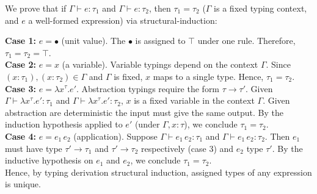 \begin{Proof}

    We prove that if $\Gamma \vdash e : \tau_1$ and $\Gamma \vdash e : \tau_2$, then $\tau_1 = \tau_2$ ($\Gamma$ is a fixed typing context, and $e$ a well-formed expression)
    via structural-induction:

    \noindent
    \textbf{Case 1:} $e = \bullet$ (unit value).  
    The $\bullet$ is assigned to $\top$ under one rule. Therefore, $\tau_1 = \tau_2 = \top$.
    \\

    \noindent
    \textbf{Case 2:} $e = x$ (a variable).  
    Variable typings depend on the context $\Gamma$. Since $(x : \tau_1), (x : \tau_2) \in \Gamma$ and $\Gamma$ is fixed, $x$ maps to a single type. Hence, $\tau_1 = \tau_2$.
    \\

    \noindent
    \textbf{Case 3:} $e = \lambda x^\tau. e'$.  
    Abstraction typings require the form $\tau \to \tau'$.  
    Given $\Gamma \vdash \lambda x^\tau. e' : \tau_1$ and $\Gamma \vdash \lambda x^\tau. e' : \tau_2$,
    $x$ is a fixed variable in the context $\Gamma$. Given abstraction are deterministic the input must give the same output.
    By the induction hypothesis applied to $e'$ (under $\Gamma,x:\tau$), we conclude $\tau_1 = \tau_2$.
    \\

    \noindent
    \textbf{Case 4:} $e = e_1\, e_2$ (application).  
    Suppose $\Gamma \vdash e_1\, e_2 : \tau_1$ and $\Gamma \vdash e_1\, e_2 : \tau_2$.  
    Then $e_1$ must have type $\tau' \to \tau_1$ and $\tau' \to \tau_2$ respectively (case 3) and $e_2$ type $\tau'$.  
    By the inductive hypothesis on $e_1$ and $e_2$, we conclude $\tau_1 = \tau_2$.
    \\

    \noindent
    Hence, by typing derivation structural induction, assigned types of any expression is unique.

    \end{Proof}
        
    